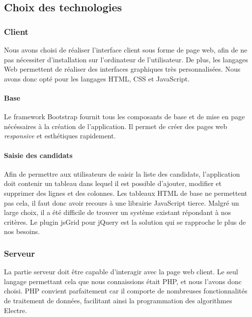 \documentclass[a4paper]{article}
\begin{document}
\newpage

\subsection{Choix des technologies}

\subsubsection{Client}

Nous avons choisi de réaliser l'interface client sous forme de page web, afin de ne pas nécessiter d'installation sur l'ordinateur de l'utilisateur. De plus, les langages Web permettent de réaliser des interfaces graphiques très personnalisées. Nous avons donc opté pour les langages HTML, CSS et JavaScript.

\paragraph{Base} Le framework Bootstrap fournit tous les composants de base et de mise en page nécéssaires à la création de l'application. Il permet de créer des pages web \textit{responsive} et esthétiques rapidement. 

\paragraph{Saisie des candidats} Afin de permettre aux utilisateurs de saisir la liste des candidats, l'application doit contenir un tableau dans lequel il est possible d'ajouter, modifier et supprimer des lignes et des colonnes. Les tableaux HTML de base ne permettent pas cela, il faut donc avoir recours à une librairie JavaScript tierce. Malgré un large choix, il a été difficile de trouver un système existant répondant à nos critères. Le plugin jsGrid pour jQuery est la solution qui se rapproche le plus de nos besoins.

\subsubsection{Serveur}

La partie serveur doit être capable d'interagir avec la page web client. Le seul langage permettant cela que nous connaissions était PHP, et nous l'avons donc choisi. PHP convient parfaitement car il comporte de nombreuses fonctionnalités de traitement de données, facilitant ainsi la programmation des algorithmes Electre.
\end{document}
